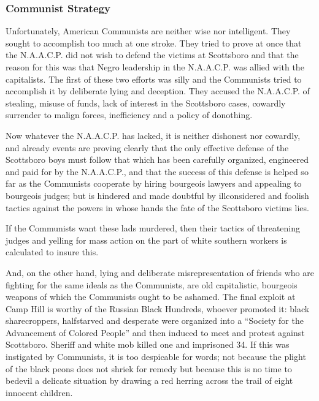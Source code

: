 \documentclass[letterpaper,10pt,english]{jupyterBook}
\begin{document}
\subsubsection{Communist Strategy}
\label{\detokenize{Volumes/38/09/negro_and_communism:communist-strategy}}
\sphinxAtStartPar
Unfortunately, American Communists are neither wise nor intelligent. They sought to accomplish too much at one stroke. They tried to prove at once that the N.A.A.C.P. did not wish to defend the victims at Scottsboro and that the reason for this was that Negro leadership in the N.A.A.C.P. was allied with the capitalists. The first of these two efforts was silly and the Communists tried to accomplish it by deliberate lying and deception. They accused the N.A.A.C.P. of stealing, misuse of funds, lack of interest in the Scottsboro cases, cowardly surrender to malign forces, inefficiency and a policy of do\sphinxhyphen{}nothing.

\sphinxAtStartPar
Now whatever the N.A.A.C.P. has lacked, it is neither dishonest nor cowardly, and already events are proving clearly that the only effective defense of the Scottsboro boys must follow that which has been carefully organized, engineered and paid for by the N.A.A.C.P., and that the success of this defense is helped so far as the Communists cooperate by hiring bourgeois lawyers and appealing to bourgeois judges; but is hindered and made doubtful by ill\sphinxhyphen{}considered and foolish tactics against the powers in whose hands the fate of the Scottsboro victims lies.

\sphinxAtStartPar
If the Communists want these lads murdered, then their tactics of threatening judges and yelling for mass action on the part of white southern workers is calculated to insure this.

\sphinxAtStartPar
And, on the other hand, lying and deliberate misrepresentation of friends who are fighting for the same ideals as the Communists, are old capitalistic, bourgeois weapons of which the Communists ought to be ashamed. The final exploit at Camp Hill is worthy of the Russian Black Hundreds, whoever promoted it: black sharecroppers, half\sphinxhyphen{}starved and desperate were organized into a “Society for the Advancement of Colored People” and then induced to meet and protest against Scottsboro. Sheriff and white mob killed one and imprisoned 34. If this was instigated by Communists, it is too despicable for words; not because the plight of the black peons does not shriek for remedy but because this is no time to bedevil a delicate situation by drawing a red herring across the trail of eight innocent children.
\end{document}
